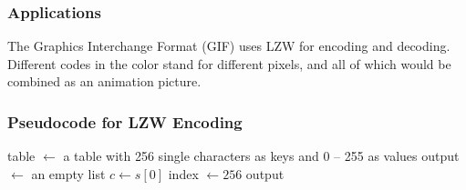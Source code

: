 \documentclass[catalog.tex]{subfiles}
\begin{document}
\subsubsection*{Applications}
The Graphics Interchange Format (GIF) uses LZW for encoding and decoding. Different codes in the color stand for different pixels, and all of which would be combined as an animation picture.

\subsubsection*{Pseudocode for LZW Encoding}
\begin{Algorithm}[LZW Encoding\label{alg:\currfilebase_a}]
	\BlankLine
    table $\leftarrow$ a table with 256 single characters as keys and 0 -- 255 as values\;
    output $\leftarrow$ an empty list\;
    $c \leftarrow s[0]$\;
    index $\leftarrow 256$\;
	\Ret output\;

\end{Algorithm}
\end{document}
